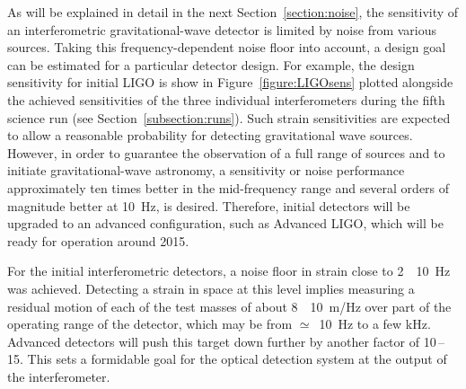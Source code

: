 \documentclass{article}
\newcommand{\Hz}{Hz\super{-1/2}\xspace}
\begin{document}
As will be explained in detail in the next Section~\ref{section:noise},
the sensitivity of an interferometric gravitational-wave detector is
limited by noise from various sources. Taking this frequency-dependent
noise floor into account, a design goal can be estimated for a
particular detector design. For example, the design sensitivity for
initial LIGO is show in Figure~\ref{figure:LIGOsens} plotted alongside
the achieved sensitivities of the three individual interferometers
during the fifth science run (see Section~\ref{subsection:runs}). Such
strain sensitivities are expected to allow a reasonable probability
for detecting gravitational wave sources. However, in order to
guarantee the observation of a full range of sources and to initiate
gravitational-wave astronomy, a sensitivity or noise performance
approximately ten times better in the mid-frequency range and several
orders of magnitude better at 10~Hz, is desired. Therefore, initial
detectors will be upgraded to an advanced configuration, such as
Advanced LIGO, which will be ready for operation around 2015.


For the initial interferometric detectors, a noise floor in strain
close to 2~\texttimes~10~\Hz was achieved. Detecting a
strain in space at this level implies measuring a residual motion of
each of the test masses of about 8~\texttimes~10~m/\Hz over
part of the operating range of the detector, which may be from
$\simeq$~10~Hz to a few kHz. Advanced detectors will push this
target down further by another factor of 10\,--\,15. This sets a
formidable goal for the optical detection system at the output of the
interferometer.
\end{document}
